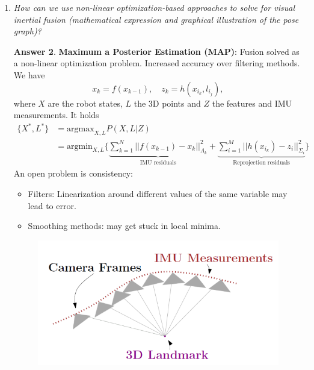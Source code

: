 \documentclass[a4paper,12 pt]{article}
\theoremstyle{definition}
\theoremstyle{remark}
\theoremstyle{definition}
\theoremstyle{definition}
\theoremstyle{definition}
\theoremstyle{definition}
\theoremstyle{remark}
\theoremstyle{remark}
\theoremstyle{definition}
\theoremstyle{definition}
\newtheorem*{answer}{Answer}
\begin{document}
\begin{enumerate}
\begin{answer}
\begin{figure}[h]
\begin{center}
\caption{Tightly Coupled Approach.}
\end{center}
\end{figure}
System states are:
\begin{itemize}
\item \textbf{Tightly Coupled:} $X=\begin{pmatrix}
p_W(t);q_{WB}(t);v_W(t);b^a(t);b^g(t);L_{w,1};\hdots;L_{w,K}\end{pmatrix}$, with $L$ Landmarks.
\item \textbf{Loosely Coupled} $X=\begin{pmatrix}
p_W(t);q_{WB}(t);v_W(t);b^a(t);b^g(t)\end{pmatrix}$
\end{itemize}
\end{answer}
\item \textit{How can we use non-linear optimization-based approaches to solve for visual inertial fusion (mathematical expression and graphical illustration of the pose graph)?}
\begin{answer}
\textbf{Maximum a Posterior Estimation (MAP)}: Fusion solved as a non-linear optimization problem. Increased accuracy over filtering methods. We have
\begin{equation}
x_k=f(x_{k-1}), \quad z_k=h(x_{i_k},l_{i_j}),
\end{equation}
where $X$ are the robot states, $L$ the 3D points and $Z$ the features and IMU measurements. It holds
\begin{equation}
\begin{split}
\{X^*,L^*\}&=\text{argmax}_{X,L}P(X,L|Z)\\
&=\text{argmin}_{X,L}\{ \underbrace{\sum_{k=1}^N ||f(x_{k-1})-x_k||_{\Lambda_k}^2}_{\text{IMU residuals}}+\underbrace{\sum_{i=1}^M ||h(x_{i_k})-z_i||_{\Sigma_i}^2}_{\text{Reprojection residuals}}\}
\end{split}
\end{equation}
An open problem is consistency: 
\begin{itemize}
\item Filters: Linearization around different values of the same variable may lead to error.
\item Smoothing methods: may get stuck in local minima.
\end{itemize}
\begin{figure}[h]
\begin{center}
\includegraphics[scale=0.4]{pics/map}

\end{center}
\end{figure}
\end{answer}
\end{enumerate}
\end{document}
